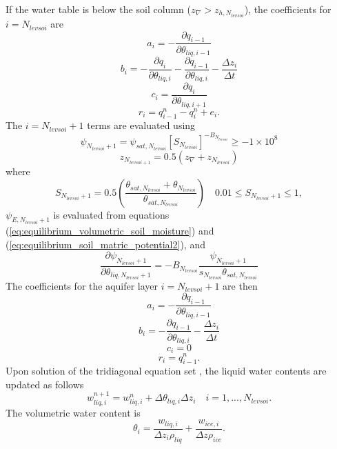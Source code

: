 \documentclass[12pt,authoryear]{elsarticle}
\numberwithin{equation}{section} %
\begin{document}
If the water table is below the soil column ($z_{\nabla}>z_{h,N_{levsoi}}$), the coefficients for $i=N_{levsoi}$ are
\begin{equation}
a_{i} = -\frac{\partial q_{i-1}}{\partial \theta_{liq,i-1}}
\end{equation}
\begin{equation}
b_{i} = - \frac{\partial q_{i}}{\partial \theta_{liq,i}} -\frac{\partial q_{i-1}}{\partial \theta_{liq,i}} - \frac{\Delta z_{i}}{\Delta t}
\end{equation}
\begin{equation}
c_{i} = \frac{\partial q_{i}}{\partial \theta_{liq,i+1}}
\end{equation}
\begin{equation}
r_{i} = q_{i-1}^{n}-q_{i}^{n}+e_{i}.
\end{equation}
The $i=N_{levsoi}+1$ terms are evaluated using
\begin{equation}
\psi_{N_{levsoi}+1}=\psi_{sat,N_{levsoi}}[S_{N_{levsoi}}]^{-B_{N_{levsoi}}}\geq -1\times10^{8}
\end{equation}
\begin{equation}
z_{N_{levsoi+1}}=0.5(z_{\nabla}+z_{N_{levsoi}})
\end{equation}
where
\begin{equation}
S_{N_{levsoi}+1} = 0.5\left(\frac{\theta_{sat,N_{levsoi}}+\theta_{N_{levsoi}}}{\theta_{sat,N_{levsoi}}}\right) \quad 0.01 \leq S_{N_{levsoi}+1}\leq 1,
\end{equation}
$\psi_{E,N_{levsoi}+1}$ is evaluated from equations (\ref{eq:equilibrium_volumetric_soil_moisture}) and (\ref{eq:equilibrium_soil_matric_potential2}), and
\begin{equation}
\frac{\partial \psi_{N_{levsoi}+1}}{\partial \theta_{liq,N_{levsoi}+1}}=-B_{N_{levsoi}}\frac{\psi_{N_{levsoi}+1}}{s_{N_{levsoi}}\theta_{sat,N_{levsoi}}}
\end{equation}
The coefficients for the aquifer layer $i=N_{levsoi}+1$ are then
\begin{equation}
a_{i} = -\frac{\partial q_{i-1}}{\partial \theta_{liq,i-1}}
\end{equation}
\begin{equation}
b_{i} = -\frac{\partial q_{i-1}}{\partial \theta_{liq,i}} - \frac{\Delta z_{i}}{\Delta t}
\end{equation}
\begin{equation}
c_{i} = 0
\end{equation}
\begin{equation}
r_{i} = q_{i-1}^{n}.
\end{equation}
Upon solution of the tridiagonal equation set \citep{pressNumericalRecipesFORTRAN1992}, the liquid water contents are updated as follows
\begin{equation}
w_{liq,i}^{n+1} = w_{liq,i}^{n}+\Delta \theta_{liq,i}\Delta z_{i} \quad i=1,...,N_{levsoi}.
\end{equation}
The volumetric water content is
\begin{equation}
\theta_{i} = \frac{w_{liq,i}}{\Delta z_{i}\rho_{liq}}+\frac{w_{ice,i}}{\Delta z\rho_{ice}}.
\end{equation}
\end{document}
